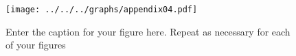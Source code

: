\documentclass[utf8]{frontiers_suppmat} %
\begin{document}
\clearpage
\begin{figure}[htbp]
    \begin{center}
        \texttt{[image: ../../../graphs/appendix04.pdf]}%
    \end{center}
    \caption{ Enter the caption for your figure here.  Repeat as  necessary for each of your figures}\label{fig:4}
\end{figure}




%
\end{document}
